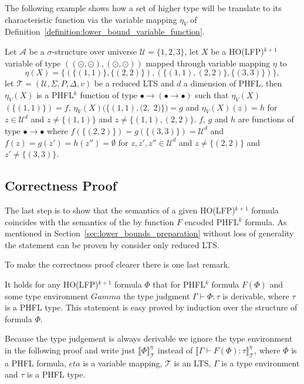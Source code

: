 The following example shows how a set of higher type will be translate to its characteristic function via the
variable mapping $\eta_V$ of Definition~\ref{definition:lower_bound_variable_function}.

\begin{example}
    Let $\mathcal{A}$ be a $\sigma$-structure over universe $\mathcal{U} = \{1, 2, 3\}$, let $X$ be a HO(LFP)$^{k + 1}$
    variable of type $((\odot, \odot), (\odot, \odot))$ mapped through variable mapping $\eta$ to
    \[\eta(X) = \{(\{(1, 1)\}, \{(2, 2)\}), (\{(1, 1), (2, 2)\}, \{(3, 3)\})\},\]
    let $\mathcal{T} = (\mathcal{U}, \Sigma, P, \Delta, v)$ be a reduced LTS and $d$ a dimension of PHFL, then $\eta_V(X)$ is a PHFL$^k$ function of type $\bullet \rightarrow (\bullet \rightarrow \bullet)$ such
    that $\eta_V(X)$ $(\{(1, 1)\}) = f$, $\eta_V(X)(\{(1, 1), (2, $ $2)\}) = g$ and $\eta_V(X)(z) = h$ for $z \in
    \mathcal{U}^d$ and $z \neq \{(1, 1)\}$ and $z \neq \{(1, 1), (2, 2)\}$. $f$, $g$ and $h$ are functions of type $\bullet
    \rightarrow \bullet$ where $f(\{(2, 2)\}) = g(\{(3, 3)\}) = \mathcal{U}^d$ and $f(z) = g(z') = h(z'') = \emptyset$ for $z,
    z', z'' \in \mathcal{U}^d$ and $z \neq \{(2, 2)\}$ and $z' \neq \{(3, 3)\}$.
\end{example}

\subsection{Correctness Proof}\label{subsec:lower_bounds_correctness_lfp}

The last step is to show that the semantics of a given HO(LFP)$^{k+1}$ formula coincides with the semantics of the by function $F$ encoded PHFL$^k$ formula. As mentioned in Section~\ref{sec:lower_bounds_preparation} without loss of generality the statement can be proven by consider only  reduced LTS. 

To make the correctness proof clearer there is one last remark.

\begin{remark}
    It holds for any HO(LFP)$^{k+1}$ formula $\Phi$ that for PHFL$^k$ formula $F(\Phi)$ and some type environment $Gamma$ the type judgment $\Gamma \vdash
    \Phi \colon \tau$ is derivable, where $\tau$ is a PHFL type. This statement
    is easy proved by induction over the structure of formula $\Phi$. 
\end{remark}

Because the type judgement is always derivable we ignore the type environment in the following proof and write just $\llbracket \Phi \rrbracket^\eta_\mathcal{T}$ instead of $\llbracket \Gamma \vdash F(\Phi) \colon \tau \rrbracket^\eta_\mathcal{T}$, where $\Phi$ is a PHFL formula, $eta$ is a variable mapping, $\mathcal{T}$ is an LTS, $\Gamma$ is a type environment and $\tau$ is a PHFL type.

